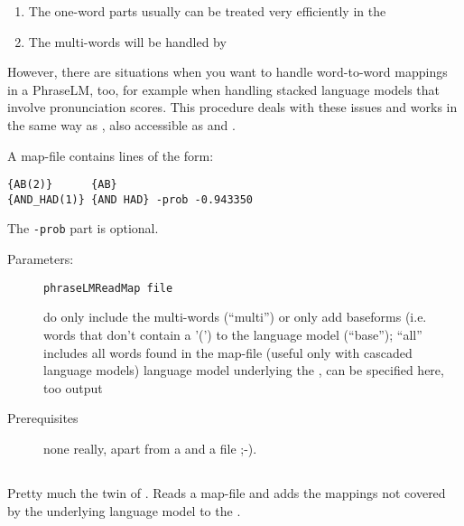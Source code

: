 \begin{enumerate}
\item The one-word parts usually can be treated very efficiently in the 
\item The multi-words will be handled by 
\end{enumerate}

However, there are situations when you want to handle word-to-word mappings
in a PhraseLM, too, for example when handling stacked language models that
involve pronunciation scores. This procedure deals with these issues and
works in the same way as , also accessible as 
 and .

A map-file contains lines of the form:

\begin{verbatim}
{AB(2)}      {AB}
{AND_HAD(1)} {AND HAD} -prob -0.943350
\end{verbatim}

The \texttt{-prob} part is optional.

\begin{description}

\item[Parameters:] \texttt{phraseLMReadMap file}

\begin{description}
 do only
include the multi-words (``multi'') or only add baseforms (i.e. words that
don't contain a '(') to the language model (``base''); ``all'' includes all
words found in the map-file (useful only with cascaded language models)
 language
model underlying the , can be specified here, too
 output
\end{description}

\item[Prerequisites] none really, apart from a 
  and a file ;-).

\end{description}

\subsection{}

Pretty much the twin of . Reads a map-file
and adds the mappings not covered by the underlying language model to
the .

